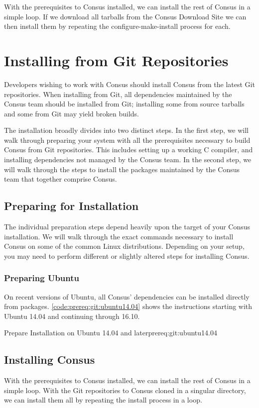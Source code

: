 With the prerequisites to Consus installed, we can install the rest of Consus in
a simple loop.  If we download all tarballs from the Consus Download Site %
we can then install them by repeating the configure-make-install process for
each.


\section{Installing from Git Repositories}
\label{sec:install:git}

Developers wishing to work with Consus should install Consus from the latest Git
repositories.  When installing from Git, all dependencies maintained by the
Consus team should be installed from Git; installing some from source tarballs
and some from Git may yield broken builds.

The installation broadly divides into two distinct steps.  In the first step, we
will walk through preparing your system with all the prerequisites necessary to
build Consus from Git repositories.  This includes setting up a working C
compiler, and installing dependencies not managed by the Consus team.  In the
second step, we will walk through the steps to install the packages maintained
by the Consus team that together comprise Consus.

\subsection{Preparing for Installation}

The individual preparation steps depend heavily upon the target of your Consus
installation.  We will walk through the exact commands necessary to install
Consus on some of the common Linux distributions.  Depending on your setup, you
may need to perform different or slightly altered steps for installing Consus.

\subsubsection*{Preparing Ubuntu}

On recent versions of Ubuntu, all Consus' dependencies can be installed directly
from packages.  \cref{code:prereq:git:ubuntu14.04} shows the instructions
starting with Ubuntu 14.04 and continuing through 16.10.

%
{Prepare Installation on Ubuntu 14.04 and later}{prereq:git:ubuntu14.04}

\subsection{Installing Consus}

With the prerequisites to Consus installed, we can install the rest of Consus in
a simple loop.  With the Git repositories to Consus cloned in a singular
directory, we can install them all by repeating the install process in a loop.

